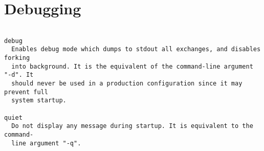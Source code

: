 
\section{Debugging}

\begin{verbatim}

debug
  Enables debug mode which dumps to stdout all exchanges, and disables forking
  into background. It is the equivalent of the command-line argument "-d". It
  should never be used in a production configuration since it may prevent full
  system startup.

quiet
  Do not display any message during startup. It is equivalent to the command-
  line argument "-q".


\end{verbatim}
